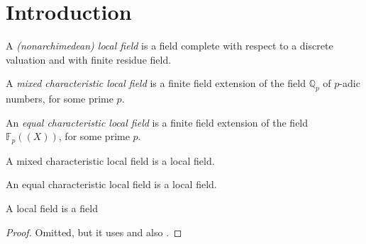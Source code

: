 \section{Introduction}

\begin{definition}
\label{local_field}
\leanok
A \textit{(nonarchimedean) local field} is a field complete with respect to a discrete
valuation and with finite residue field.
\end{definition}

\begin{definition}
\label{mixed_char_local_field}
\leanok
A \textit{mixed characteristic local field} is a finite field extension of the field 
$\mathbb{Q}_p$ of $p$-adic numbers, for some prime $p$.
\end{definition}

\begin{definition}
\label{eq_char_local_field}
\leanok
An \textit{equal characteristic local field} is a finite field extension of the field 
$\mathbb{F}_p((X))$, for some prime $p$.
\end{definition}

\begin{lemma}
\label{mixed_char_local_field.local_field}
A mixed characteristic local field is a local field.
\end{lemma}

\begin{lemma}
\label{eq_char_local_field.local_field}
An equal characteristic local field is a local field.
\end{lemma}

\begin{definition}
\label{def_local_field}
A local field is a field
\end{definition}


\begin{proof}
\leanok
Omitted, but it uses \cite{SerCF} and also \cite{Se2}.
\end{proof}